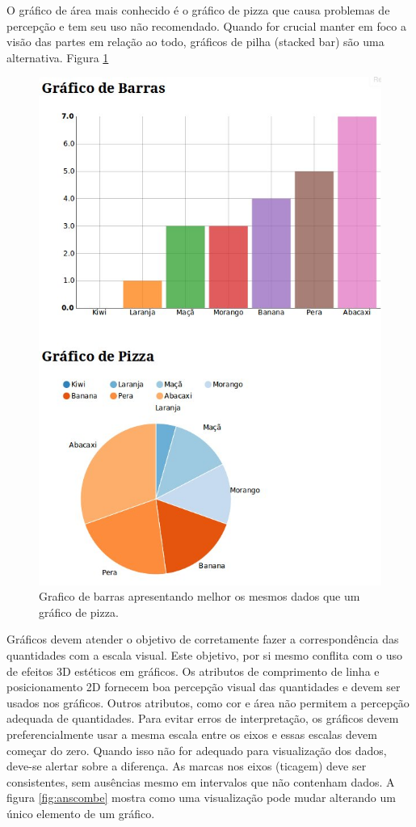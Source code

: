 \documentclass[]{article}
\begin{document}
O gráfico de área mais conhecido é o gráfico de pizza que causa problemas de percepção e tem seu uso não recomendado. Quando for crucial manter em foco a visão das partes em relação ao todo, gráficos de pilha (stacked bar) são uma alternativa. Figura \ref{fig:pizzavsbarras}

\begin{figure}[!ht]
\centering
\includegraphics[scale=.3]{./pizzavsbarras}
\caption{Grafico de barras apresentando melhor os mesmos dados que um gráfico de pizza.}
\label{fig:pizzavsbarras}
\end{figure}

Gráficos devem atender o objetivo de corretamente fazer a correspondência das quantidades com a escala visual. Este objetivo, por si mesmo conflita com o uso de efeitos 3D estéticos em gráficos. 
Os atributos de comprimento de linha e posicionamento 2D fornecem boa percepção visual das quantidades e devem ser usados nos gráficos. Outros atributos, como cor e área não permitem a percepção adequada de quantidades.
Para evitar erros de interpretação, os gráficos devem preferencialmente usar a mesma escala entre os eixos e essas escalas devem começar do zero. Quando isso não for adequado para visualização dos dados, deve-se alertar sobre a diferença. As marcas nos eixos (ticagem) deve ser consistentes, sem ausências mesmo em intervalos que não contenham dados.
A figura \ref{fig:anscombe} mostra como uma visualização pode mudar alterando um único elemento de um gráfico.
\end{document}
